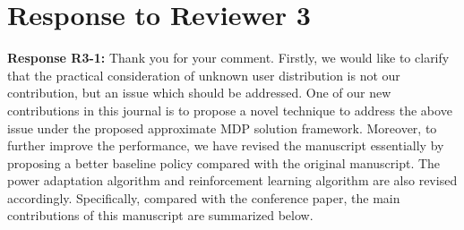 \documentclass[12pt,onecolumn]{IEEEtran}
\newcommand{\blue}{\color{blue}}
\newcommand{\spaceblank}{\vskip 4mm}
\begin{document}
\section{Response to Reviewer 3}
\spaceblank
{}
\spaceblank
{\blue \textbf{Response R3-1:} Thank you for your comment. Firstly, we would like to clarify that the practical consideration of unknown user distribution is not our contribution, but an issue which should be addressed. One of our new contributions in this journal is to propose a novel technique to address the above issue under the proposed approximate MDP solution framework. Moreover, to further improve the performance, we have revised the manuscript essentially by proposing a better baseline policy compared with the original manuscript. The power adaptation algorithm and reinforcement learning algorithm are also revised accordingly. Specifically, compared with the conference paper, the main contributions of this manuscript are summarized below. 


}
\end{document}
